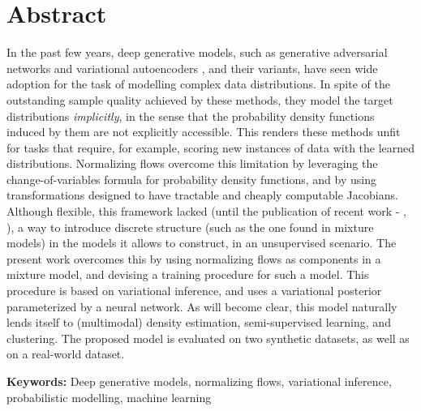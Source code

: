 \section*{Abstract}


In the past few years, deep generative models, such as generative adversarial networks
\autocite{GAN} and variational autoencoders \autocite{vaepaper}, and their variants,
have seen wide adoption for the task of modelling complex data distributions.
In spite of the outstanding sample quality achieved by these methods,
they model the target distributions \emph{implicitly}, in the sense that the probability
density functions induced by them are not explicitly accessible. This renders these methods unfit for
tasks that require, for example, scoring new instances of data with the learned
distributions. Normalizing flows overcome this limitation by leveraging the
change-of-variables formula for probability density functions, and by using
transformations designed to have tractable and cheaply computable Jacobians. Although
flexible, this framework lacked (until the publication of recent work -
\autocite{semisuplearning_nflows}, \autocite{RAD}), a way to introduce discrete
structure (such as the one found in mixture models) in the models it allows to
construct, in an unsupervised scenario. The present work overcomes this by using normalizing flows as components in a mixture model,
and devising a training procedure for such a model.
This procedure is based on variational inference, and uses a variational posterior
parameterized by a neural network. As will become clear, this model naturally
lends itself to (multimodal) density estimation, semi-supervised learning, and
clustering. The proposed model is evaluated on two synthetic datasets, as well
as on a real-world dataset.
\vfill

\textbf{\Large Keywords:} Deep generative models, normalizing flows, variational
inference, probabilistic modelling, machine learning
